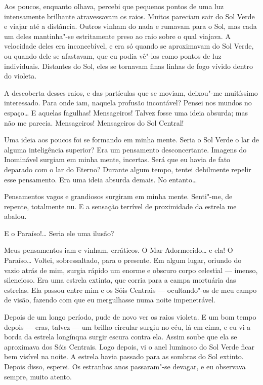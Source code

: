 Aos poucos, enquanto olhava, percebi que pequenos pontos de uma luz intensamente brilhante atravessavam os raios.
Muitos pareciam sair do Sol Verde e viajar até a distância. Outros vinham do nada e rumavam para o Sol, mas cada um
deles mantinha"-se estritamente preso ao raio sobre o qual viajava. A velocidade deles era inconcebível, e era só quando
se aproximavam do Sol Verde, ou quando dele se afastavam, que eu podia vê"-los como pontos de luz individuais. Distantes
do Sol, eles se tornavam finas linhas de fogo vívido dentro do violeta.

A descoberta desses raios, e das partículas que se moviam, deixou"-me muitíssimo interessado. Para onde iam, naquela
profusão incontável? Pensei nos mundos no espaço\ldots{} E aquelas fagulhas! Mensageiros! Talvez fosse uma ideia absurda;
mas não me parecia. Mensageiros! Mensageiros do Sol Central!

Uma ideia aos poucos foi se formando em minha mente. Seria o Sol Verde o lar de alguma inteligência superior? Era um
pensamento desconcertante. Imagens do Inominável surgiam em minha mente, incertas. Será que eu havia de fato
deparado com o lar do Eterno? Durante algum tempo, tentei debilmente repelir esse pensamento. Era uma ideia absurda
demais. No entanto\ldots{}

Pensamentos vagos e grandiosos surgiram em minha mente. Senti"-me, de repente, totalmente nu. E a sensação terrível de
proximidade da estrela me abalou.

E o Paraíso!\ldots{} Seria ele uma ilusão?

Meus pensamentos iam e vinham, erráticos. O Mar Adormecido\ldots{} e ela! O Paraíso\ldots{} Voltei, sobressaltado, para o
presente. Em algum lugar, oriundo do vazio atrás de mim, surgia rápido um enorme e obscuro corpo celestial --- imenso,
silencioso. Era uma estrela extinta, que corria para a campa mortuária das estrelas. Ela passou entre mim e os Sóis
Centrais --- ocultando"-os de meu campo de visão, fazendo com que eu mergulhasse numa noite impenetrável.

Depois de um longo período, pude de novo ver os raios violeta. E um bom tempo depois --- eras, talvez --- um brilho
circular surgiu no céu, lá em cima, e eu vi a borda da estrela longínqua surgir escura contra ela. Assim soube que
ela se aproximava dos Sóis Centrais. Logo depois, vi o anel luminoso do Sol Verde ficar bem visível na noite. A estrela
havia passado para as sombras do Sol extinto. Depois disso, esperei. Os estranhos anos passaram"-se devagar, e eu
observava sempre, muito atento.

